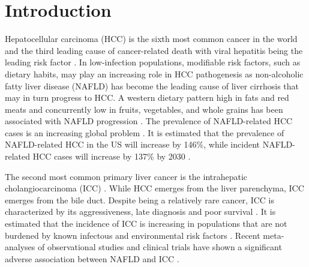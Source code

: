 \documentclass[nutrients,article,submit,moreauthors,pdftex]{Definitions/mdpi}
\begin{document}

\hypertarget{sec1}{%
\section{Introduction}\label{sec1}}

Hepatocellular carcinoma (HCC) is the sixth most common cancer in the
world and the third leading cause of cancer-related death with viral
hepatitis being the leading risk factor \citep{Massarweh2017}. In
low-infection populations, modifiable risk factors, such as dietary
habits, may play an increasing role in HCC pathogenesis as non-alcoholic
fatty liver disease (NAFLD) has become the leading cause of liver
cirrhosis \citep{Younossi2016, Younossi2020} that may in turn progress to
HCC. A western dietary pattern high in fats and red meats and
concurrently low in fruits, vegetables, and whole grains has been
associated with NAFLD progression \citep{Guo2022}. The prevalence of
NAFLD-related HCC cases is an increasing global problem \citep{Younossi2016}.
It is estimated that the prevalence of NAFLD-related HCC in the US will
increase by 146\%, while incident NAFLD-related HCC cases will increase
by 137\% by 2030 \citep{Estes2018}.

The second most common primary liver cancer is the intrahepatic
cholangiocarcinoma (ICC) \citep{Khan2019}. While HCC emerges from the liver
parenchyma, ICC emerges from the bile duct. Despite being a relatively
rare cancer, ICC is characterized by its aggressiveness, late diagnosis
and poor survival \citep{kirstein2016}. It is estimated that the incidence of
ICC is increasing in populations that are not burdened by known
infectous and environmental risk factors \citep{Bergquist2015}. Recent
meta-analyses of observational studies and clinical trials have shown a
significant adverse association between NAFLD and ICC
\citep{Wongjarupong2017, corrao2020}.
\end{document}
